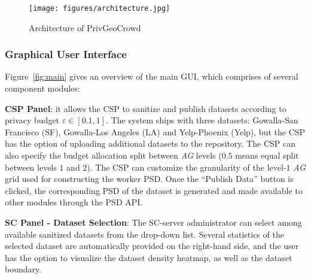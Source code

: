 \documentclass{USC-Thesis}
\newcommand{\PGC}{{PrivGeoCrowd}}
\numberwithin{equation}{chapter}
\begin{document}


\begin{figure}[!htb]\centering
  \texttt{[image: figures/architecture.jpg]}
  \caption{Architecture of \PGC}
  \label{fig:architecture}
\end{figure}

\subsubsection{Graphical User Interface}
\label{sec:gui}

Figure~\ref{fig:main} gives an overview of the main GUI, which comprises of several component modules:

\textbf{CSP Panel}: it allows the CSP to sanitize and publish datasets according to privacy budget $\varepsilon \in [0.1,1]$. The system ships with three datasets: Gowalla-San Francisco (SF), Gowalla-Los Angeles (LA) and Yelp-Phoenix (Yelp), but the CSP has the option of uploading additional datasets to the repository. The CSP can also specify the budget allocation split between {\em AG} levels ($0.5$ means equal split between levels $1$ and $2$). The CSP can customize the granularity of the level-$1$ {\em AG} grid used for constructing the worker PSD. Once the ``Publish Data'' button is clicked, the corresponding PSD of the dataset is generated and made available to other modules through the PSD API.

\textbf{SC Panel - Dataset Selection}: The SC-server administrator can select among available sanitized datasets from the drop-down list. Several statistics of the selected dataset are automatically provided on the right-hand side, and the user has the option to visualize the dataset density heatmap, as well as the dataset boundary.
\end{document}
